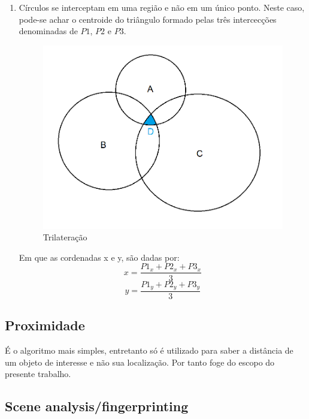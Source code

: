 \begin{enumerate}
	\item Círculos se interceptam em uma região e não em um único ponto. Neste caso, pode-se achar o centroide do triângulo formado pelas três intercecções denominadas de \( P 1\), \( P 2\) e \( P 3\).

	\begin{figure}[H]
		\centering
		\includegraphics[scale = 0.8]{images/trilateration2.png}
		\caption{Trilateração \cite{art12}}
		\label{fig:trilateration2.png}
	\end{figure}

	Em que as cordenadas x e y, são dadas por:
	\begin{equation}
		x = \frac{P1_x + P2_x + P3_x}{3}
	\end{equation}
	\begin{equation}
		y = \frac{P1_y + P2_y + P3_y}{3}
	\end{equation}



\end{enumerate}




\subsection{Proximidade}
É o algoritmo mais simples, entretanto só é utilizado para saber a distância de um objeto de interesse e não sua localização. Por tanto foge do escopo do presente trabalho.


\subsection{Scene analysis/fingerprinting}

